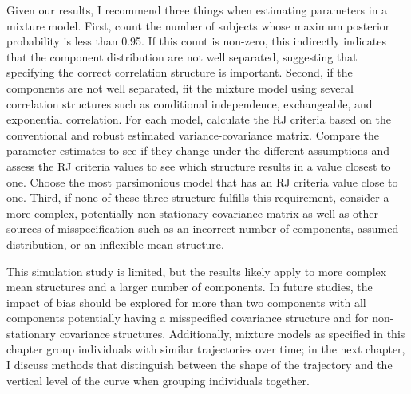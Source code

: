Given our results, I recommend three things when estimating parameters in a mixture model. First, count the number of subjects whose maximum posterior probability is less than 0.95. If this count is non-zero, this indirectly indicates that the component distribution are not well separated, suggesting that specifying the correct correlation structure is important. Second, if the components are not well separated, fit the mixture model using several correlation structures such as conditional independence, exchangeable, and exponential correlation. For each model, calculate the RJ criteria based on the conventional and robust estimated variance-covariance matrix.  Compare the parameter estimates to see if they change under the different assumptions and assess the RJ criteria values to see which structure results in a value closest to one. Choose the most parsimonious model that has an RJ criteria value close to one.  Third, if none of these three structure fulfills this requirement, consider a more complex, potentially non-stationary covariance matrix as well as other sources of misspecification such as an incorrect number of components, assumed distribution, or an inflexible mean structure.

This simulation study is limited, but the results likely apply to more complex mean structures and a larger number of components. In future studies, the impact of bias should be explored for more than two components with all components potentially having a misspecified covariance structure and for non-stationary covariance structures. Additionally, mixture models as specified in this chapter group individuals with similar trajectories over time; in the next chapter, I discuss methods that distinguish between the shape of the trajectory and the vertical level of the curve when grouping individuals together.




